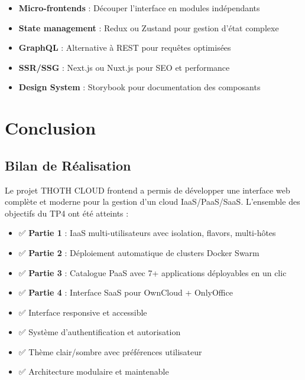 \documentclass[12pt,a4paper]{article}
\begin{document}
\begin{infobox}
\begin{itemize}
    \item \textbf{Micro-frontends} : Découper l'interface en modules indépendants
    \item \textbf{State management} : Redux ou Zustand pour gestion d'état complexe
    \item \textbf{GraphQL} : Alternative à REST pour requêtes optimisées
    \item \textbf{SSR/SSG} : Next.js ou Nuxt.js pour SEO et performance
    \item \textbf{Design System} : Storybook pour documentation des composants
\end{itemize}
\end{infobox}

\section{Conclusion}

\subsection{Bilan de Réalisation}

Le projet THOTH CLOUD frontend a permis de développer une interface web complète et moderne pour la gestion d'un cloud IaaS/PaaS/SaaS. L'ensemble des objectifs du TP4 ont été atteints :

\begin{successbox}
\begin{itemize}
    \item ✅ \textbf{Partie 1} : IaaS multi-utilisateurs avec isolation, flavors, multi-hôtes
    \item ✅ \textbf{Partie 2} : Déploiement automatique de clusters Docker Swarm
    \item ✅ \textbf{Partie 3} : Catalogue PaaS avec 7+ applications déployables en un clic
    \item ✅ \textbf{Partie 4} : Interface SaaS pour OwnCloud + OnlyOffice
    \item ✅ Interface responsive et accessible
    \item ✅ Système d'authentification et autorisation
    \item ✅ Thème clair/sombre avec préférences utilisateur
    \item ✅ Architecture modulaire et maintenable
\end{itemize}
\end{successbox}
\end{document}
